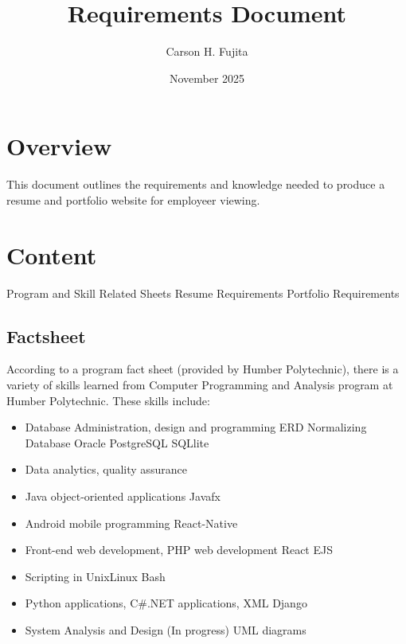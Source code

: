 \documentclass{report}
\title{Requirements Document}
\author{Carson H. Fujita}
\date{November 2025}
\begin{document}
	\maketitle
	\newpage

	\section*{Overview}
	This document outlines the requirements and knowledge needed to produce a resume and portfolio website for employeer viewing. 

	\section*{Content}
	\begin{outline}
		 Program and Skill Related Sheets
		 Resume Requirements
		 Portfolio Requirements
	\end{outline}
	\newpage
	\subsection*{Factsheet}
    	\label{sec:factsheet} %
	According to a program fact sheet (provided by Humber Polytechnic), there is a variety of skills learned from Computer Programming and Analysis program at Humber Polytechnic. These skills include:
	\begin{itemize}
		\item Database Administration, design and programming
			\subitem ERD
			\subitem Normalizing Database
			\subitem Oracle
			\subitem PostgreSQL
			\subitem SQLlite
		\item Data analytics, quality assurance
		\item Java object-oriented applications
			\subitem Javafx
		\item Android mobile programming
			\subitem React-Native
		\item Front-end web development, PHP web development
			\subitem React
			\subitem EJS
		\item Scripting in Unix\/Linux
			\subitem Bash
		\item Python applications, C\#.NET applications, XML
			\subitem Django
		\item System Analysis and Design (In progress)
			\subitem UML diagrams
	\end{itemize}
\end{document}
